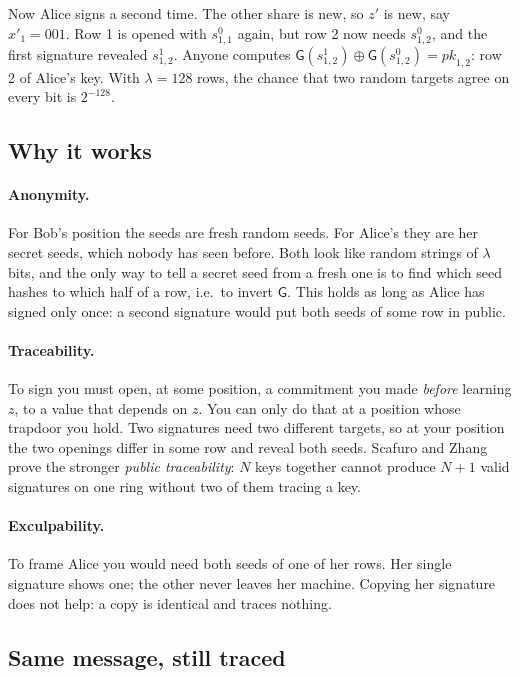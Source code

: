 \documentclass[11pt,a4paper]{article}
\newcommand{\pk}{\mathit{pk}}
\newcommand{\Gf}{\mathsf{G}}
\theoremstyle{definition}
\begin{document}
Now Alice signs a second time. The other share is new, so $z'$ is new,
say $x'_1 = 001$. Row 1 is opened with $s^0_{1,1}$ again, but row 2 now
needs $s^0_{1,2}$, and the first signature revealed $s^1_{1,2}$. Anyone
computes $\Gf(s^1_{1,2}) \oplus \Gf(s^0_{1,2}) = \pk_{1,2}$: row 2 of
Alice's key. With $\lambda = 128$ rows, the chance that two random
targets agree on every bit is $2^{-128}$.

\subsection{Why it works}

\paragraph{Anonymity.} For Bob's position the seeds are fresh random
seeds. For Alice's they are her secret seeds, which nobody has seen
before. Both look like random strings of $\lambda$ bits, and the only way
to tell a secret seed from a fresh one is to find which seed hashes to
which half of a row, i.e.\ to invert $\Gf$. This holds as long as Alice
has signed only once: a second signature would put both seeds of some row
in public.

\paragraph{Traceability.} To sign you must open, at some position, a
commitment you made \emph{before} learning $z$, to a value that depends on
$z$. You can only do that at a position whose trapdoor you hold. Two
signatures need two different targets, so at your position the two
openings differ in some row and reveal both seeds. Scafuro and Zhang prove
the stronger \emph{public traceability}: $N$ keys together cannot produce
$N + 1$ valid signatures on one ring without two of them tracing a key.

\paragraph{Exculpability.} To frame Alice you would need both seeds of
one of her rows. Her single signature shows one; the other never leaves
her machine. Copying her signature does not help: a copy is identical and
traces nothing.

\subsection{Same message, still traced}
\end{document}
